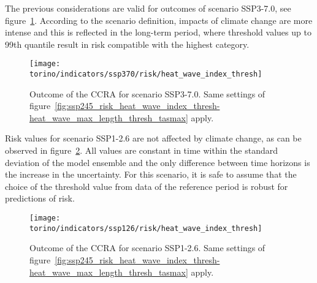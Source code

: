 The previous considerations are valid for outcomes of scenario SSP3-7.0, see figure~\ref{fig:ssp370_risk_heat_wave_index_thresh-heat_wave_max_length_thresh_tasmax}. According to the scenario definition, impacts of climate change are more intense and this is reflected in the long-term period, where threshold values up to 99th quantile result in risk compatible with the highest category.

\begin{figure}[h]
  \centering
  \texttt{[image: torino/indicators/ssp370/risk/heat\_wave\_index\_thresh]}
  \caption{Outcome of the \gls{CCRA} for scenario SSP3-7.0. Same settings of figure~\ref{fig:ssp245_risk_heat_wave_index_thresh-heat_wave_max_length_thresh_tasmax} apply.}
  \label{fig:ssp370_risk_heat_wave_index_thresh-heat_wave_max_length_thresh_tasmax}
\end{figure}

Risk values for scenario SSP1-2.6 are not affected by climate change, as can be observed in figure~\ref{fig:ssp126_risk_heat_wave_index_thresh-heat_wave_max_length_thresh_tasmax}. All values are constant in time within the standard deviation of the model ensemble and the only difference between time horizons is the increase in the uncertainty. For this scenario, it is safe to assume that the choice of the threshold value from data of the reference period is robust for predictions of risk.

\begin{figure}[h]
  \centering
  \texttt{[image: torino/indicators/ssp126/risk/heat\_wave\_index\_thresh]}
  \caption{Outcome of the \gls{CCRA} for scenario SSP1-2.6. Same settings of figure~\ref{fig:ssp245_risk_heat_wave_index_thresh-heat_wave_max_length_thresh_tasmax} apply.}
  \label{fig:ssp126_risk_heat_wave_index_thresh-heat_wave_max_length_thresh_tasmax}
\end{figure}
